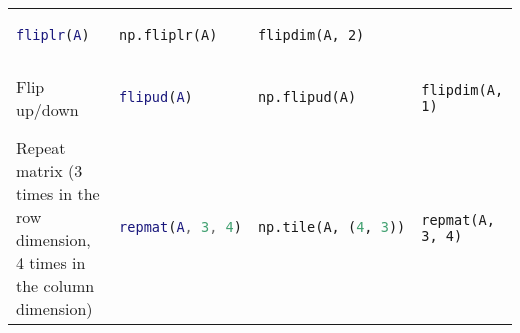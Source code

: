 \documentclass[]{article}
\begin{document}
\begin{longtable}[]{@{}llll@{}}
\begin{minipage}[t]{0.23\columnwidth}
\begin{lstlisting}[language=Matlab]
fliplr(A)
\end{lstlisting}
\strut
\end{minipage} & \begin{minipage}[t]{0.20\columnwidth}\raggedright\strut
\begin{lstlisting}[language=Python]
np.fliplr(A)
\end{lstlisting}
\strut
\end{minipage} & \begin{minipage}[t]{0.20\columnwidth}\raggedright\strut
\begin{lstlisting}
flipdim(A, 2)
\end{lstlisting}
\strut
\end{minipage}\tabularnewline
\begin{minipage}[t]{0.24\columnwidth}\raggedright\strut
Flip up/down\strut
\end{minipage} & \begin{minipage}[t]{0.23\columnwidth}\raggedright\strut
\begin{lstlisting}[language=Matlab]
flipud(A)
\end{lstlisting}
\strut
\end{minipage} & \begin{minipage}[t]{0.20\columnwidth}\raggedright\strut
\begin{lstlisting}[language=Python]
np.flipud(A)
\end{lstlisting}
\strut
\end{minipage} & \begin{minipage}[t]{0.20\columnwidth}\raggedright\strut
\begin{lstlisting}
flipdim(A, 1)
\end{lstlisting}
\strut
\end{minipage}\tabularnewline
\begin{minipage}[t]{0.24\columnwidth}\raggedright\strut
Repeat matrix (3 times in the row dimension, 4 times in the column
dimension)\strut
\end{minipage} & \begin{minipage}[t]{0.23\columnwidth}\raggedright\strut
\begin{lstlisting}[language=Matlab]
repmat(A, 3, 4)
\end{lstlisting}
\strut
\end{minipage} & \begin{minipage}[t]{0.20\columnwidth}\raggedright\strut
\begin{lstlisting}[language=Python]
np.tile(A, (4, 3))
\end{lstlisting}
\strut
\end{minipage} & \begin{minipage}[t]{0.20\columnwidth}\raggedright\strut
\begin{lstlisting}
repmat(A, 3, 4)
\end{lstlisting}
\strut
\end{minipage}\tabularnewline
\bottomrule
\end{longtable}
\end{document}
